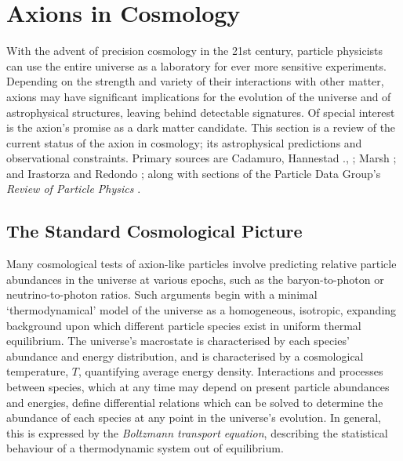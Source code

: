 \chapter{Axions in Cosmology}


With the advent of precision cosmology in the 21st century, particle physicists can use the entire universe as a laboratory for ever more sensitive experiments.
Depending on the strength and variety of their interactions with other matter, axions may have significant implications for the evolution of the universe and of astrophysical structures, leaving behind detectable signatures.
Of special interest is the axion's promise as a dark matter candidate.
This section is a review of the current status of the axion in cosmology; its astrophysical predictions and observational constraints.
Primary sources are Cadamuro, Hannestad \etal., \cite[{}2011]{Cadamuro_2011}; Marsh \cite[{}2016]{Marsh_2016}; and Irastorza and Redondo \cite[{}2018]{Irastorza_2018}; along with sections of the Particle Data Group's \emph{Review of Particle Physics} \cite[{}2020]{ParticleDataGroup-review-2020}.






\section{The Standard Cosmological Picture}

Many cosmological tests of axion-like particles involve predicting relative particle abundances in the universe at various epochs, such as the baryon-to-photon or neutrino-to-photon ratios.
Such arguments begin with a minimal `thermodynamical' model of the universe as a homogeneous, isotropic, expanding background upon which different particle species exist in uniform thermal equilibrium.
The universe's macrostate is characterised by each species' abundance and energy distribution, and is characterised by a cosmological temperature, $T$, quantifying average energy density.
Interactions and processes between species, which at any time may depend on present particle abundances and energies, define differential relations which can be solved to determine the abundance of each species at any point in the universe's evolution.
In general, this is expressed by the \emph{Boltzmann transport equation}, describing the statistical behaviour of a thermodynamic system out of equilibrium. 


